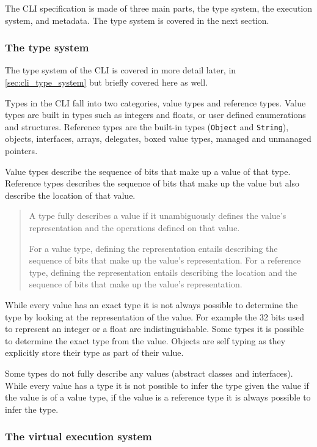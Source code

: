 \documentclass[english]{report}
\begin{document}
The CLI specification is made of three main parts, the type system, the
execution system, and metadata. The type system is covered in the next section.

\subsubsection{The type system}

The type system of the CLI is covered in more detail later, in
\ref{sec:cli_type_system} but briefly covered here as well.

Types in the CLI fall into two categories, value types and reference types.
Value types are built in types such as integers and floats, or user defined
enumerations and structures. Reference types are the built-in types
(\texttt{Object} and \texttt{String}), objects, interfaces, arrays, delegates,
boxed value types, managed and unmanaged pointers.

Value types describe the sequence of bits that make up a value of that type.
Reference types describes the sequence of bits that make up the value but also
describe the location of that value.

\begin{quotation}
A type fully describes a value if it unambiguously defines the value's
representation and the operations defined on that value.

For a value type, defining the representation entails describing the sequence
of bits that make up the value's representation. For a reference type, defining
the representation entails describing the location and the sequence of bits
that make up the value's representation.
\end{quotation}

While every value has an exact type it is not always possible to determine the
type by looking at the representation of the value. For example the 32 bits
used to represent an integer or a float are indistinguishable. Some types it is
possible to determine the exact type from the value. Objects are self typing as
they explicitly store their type as part of their value.

Some types do not fully describe any values (abstract classes and interfaces).
While every value has a type it is not possible to infer the type given the
value if the value is of a value type, if the value is a reference type it is
always possible to infer the type.

\subsubsection{The virtual execution system}
\end{document}
